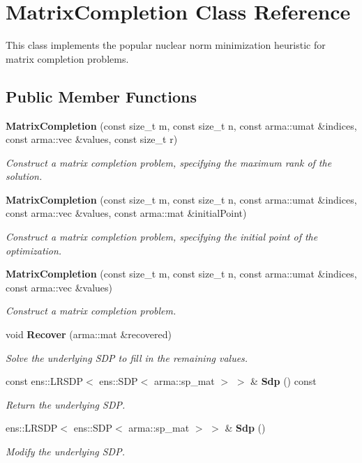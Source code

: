 \section{Matrix\+Completion Class Reference}
\label{classmlpack_1_1matrix__completion_1_1MatrixCompletion}


This class implements the popular nuclear norm minimization heuristic for matrix completion problems.  


\subsection*{Public Member Functions}
\begin{DoxyCompactItemize}
\item 
\textbf{ Matrix\+Completion} (const size\+\_\+t m, const size\+\_\+t n, const arma\+::umat \&indices, const arma\+::vec \&values, const size\+\_\+t r)
\begin{DoxyCompactList}\small\item\em Construct a matrix completion problem, specifying the maximum rank of the solution. \end{DoxyCompactList}\item 
\textbf{ Matrix\+Completion} (const size\+\_\+t m, const size\+\_\+t n, const arma\+::umat \&indices, const arma\+::vec \&values, const arma\+::mat \&initial\+Point)
\begin{DoxyCompactList}\small\item\em Construct a matrix completion problem, specifying the initial point of the optimization. \end{DoxyCompactList}\item 
\textbf{ Matrix\+Completion} (const size\+\_\+t m, const size\+\_\+t n, const arma\+::umat \&indices, const arma\+::vec \&values)
\begin{DoxyCompactList}\small\item\em Construct a matrix completion problem. \end{DoxyCompactList}\item 
void \textbf{ Recover} (arma\+::mat \&recovered)
\begin{DoxyCompactList}\small\item\em Solve the underlying S\+DP to fill in the remaining values. \end{DoxyCompactList}\item 
const ens\+::\+L\+R\+S\+DP$<$ ens\+::\+S\+DP$<$ arma\+::sp\+\_\+mat $>$ $>$ \& \textbf{ Sdp} () const
\begin{DoxyCompactList}\small\item\em Return the underlying S\+DP. \end{DoxyCompactList}\item 
ens\+::\+L\+R\+S\+DP$<$ ens\+::\+S\+DP$<$ arma\+::sp\+\_\+mat $>$ $>$ \& \textbf{ Sdp} ()
\begin{DoxyCompactList}\small\item\em Modify the underlying S\+DP. \end{DoxyCompactList}\end{DoxyCompactItemize}


